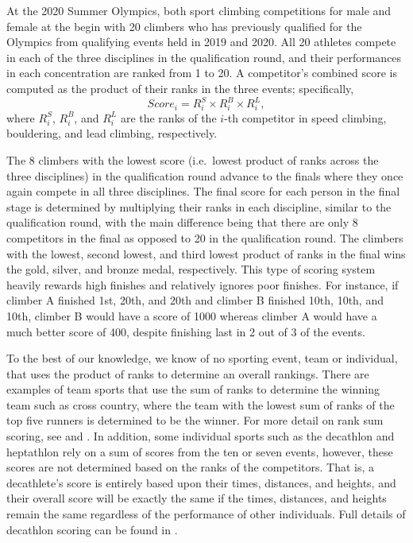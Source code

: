 \documentclass[12pt]{article}
\begin{document}
At the 2020 Summer Olympics, both sport climbing competitions for male
and female at the begin with 20 climbers who has previously qualified
for the Olympics from qualifying events held in 2019 and 2020. All 20
athletes compete in each of the three disciplines in the qualification
round, and their performances in each concentration are ranked from 1 to
20. A competitor's combined score is computed as the product of their
ranks in the three events; specifically, \begin{equation}
Score_i = R^S_i\times R^B_i\times R^L_i,
\end{equation} where \(R^S_i\), \(R^B_i\), and \(R^L_i\) are the ranks
of the \(i\)-th competitor in speed climbing, bouldering, and lead
climbing, respectively.

The 8 climbers with the lowest score (i.e.~lowest product of ranks
across the three disciplines) in the qualification round advance to the
finals where they once again compete in all three disciplines. The final
score for each person in the final stage is determined by multiplying
their ranks in each discipline, similar to the qualification round, with
the main difference being that there are only 8 competitors in the final
as opposed to 20 in the qualification round. The climbers with the
lowest, second lowest, and third lowest product of ranks in the final
wins the gold, silver, and bronze medal, respectively. This type of
scoring system heavily rewards high finishes and relatively ignores poor
finishes. For instance, if climber A finished 1st, 20th, and 20th and
climber B finished 10th, 10th, and 10th, climber B would have a score of
1000 whereas climber A would have a much better score of 400, despite
finishing last in 2 out of 3 of the events.

To the best of our knowledge, we know of no sporting event, team or
individual, that uses the product of ranks to determine an overall
rankings. There are examples of team sports that use the sum of ranks to
determine the winning team such as cross country, where the team with
the lowest sum of ranks of the top five runners is determined to be the
winner. For more detail on rank sum scoring, see \citet{hammond2007} and
\citet{boudreau2018}. In addition, some individual sports such as the
decathlon and heptathlon rely on a sum of scores from the ten or seven
events, however, these scores are not determined based on the ranks of
the competitors. That is, a decathlete's score is entirely based upon
their times, distances, and heights, and their overall score will be
exactly the same if the times, distances, and heights remain the same
regardless of the performance of other individuals. Full details of
decathlon scoring can be found in \citet{westera2006}.
\end{document}
